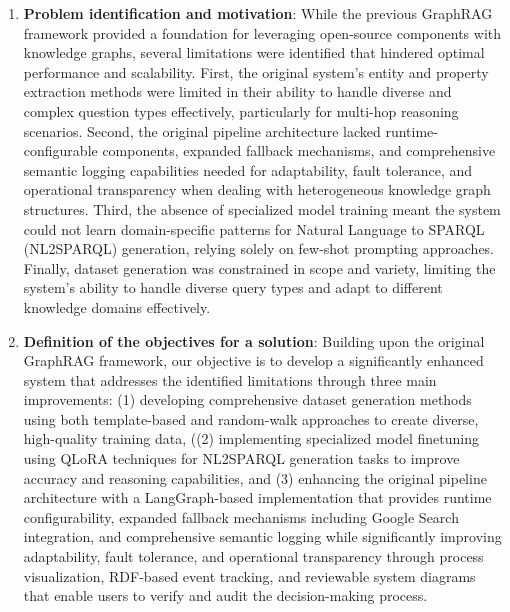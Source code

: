 \begin{enumerate}
    \item \textbf{Problem identification and motivation}: While the previous GraphRAG framework provided a foundation for leveraging open-source components with knowledge graphs, several limitations were identified that hindered optimal performance and scalability. First, the original system's entity and property extraction methods were limited in their ability to handle diverse and complex question types effectively, particularly for multi-hop reasoning scenarios. Second, the original pipeline architecture lacked runtime-configurable components, expanded fallback mechanisms, and comprehensive semantic logging capabilities needed for adaptability, fault tolerance, and operational transparency when dealing with heterogeneous knowledge graph structures. Third, the absence of specialized model training meant the system could not learn domain-specific patterns for Natural Language to SPARQL (NL2SPARQL) generation, relying solely on few-shot prompting approaches. Finally, dataset generation was constrained in scope and variety, limiting the system's ability to handle diverse query types and adapt to different knowledge domains effectively.
    \item \textbf{Definition of the objectives for a solution}: Building upon the original GraphRAG framework, our objective is to develop a significantly enhanced system that addresses the identified limitations through three main improvements: (1) developing comprehensive dataset generation methods using both template-based and random-walk approaches to create diverse, high-quality training data, ((2) implementing specialized model finetuning using QLoRA techniques for NL2SPARQL generation tasks to improve accuracy and reasoning capabilities, and (3) enhancing the original pipeline architecture with a LangGraph-based implementation that provides runtime configurability, expanded fallback mechanisms including Google Search integration, and comprehensive semantic logging while significantly improving adaptability, fault tolerance, and operational transparency through process visualization, RDF-based event tracking, and reviewable system diagrams that enable users to verify and audit the decision-making process.

\end{enumerate}
